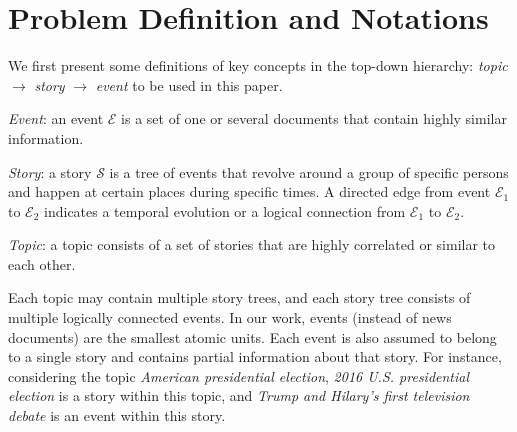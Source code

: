 \section{Problem Definition and Notations}
\label{sec:problem}









We first present some definitions of key concepts in the top-down hierarchy: \textit{topic} $\rightarrow$ \textit{story} $\rightarrow$ \textit{event} to be used in this paper.

\begin{definition}
  \textit{Event}: an event $\mathcal{E}$ is a set of one or several documents that contain highly similar information.
\end{definition}

\begin{definition}
  \textit{Story}: a story $\mathcal{S}$ is a tree of events that revolve around a group of specific persons and happen at certain places during specific times. A directed edge from event $\mathcal{E}_1$ to $\mathcal{E}_2$ indicates a temporal evolution or a logical connection from $\mathcal{E}_1$ to $\mathcal{E}_2$.
\end{definition}

\begin{definition}
  \textit{Topic}: a topic consists of a set of stories that are highly correlated or similar to each other.
  \vspace{-1mm}
\end{definition}


Each topic may contain multiple story trees, and each story tree consists of multiple logically connected events.
In our work, events (instead of news documents) are the smallest atomic units. Each event is also assumed to belong to a single story and contains partial information about that story.
For instance, considering the topic \textit{American presidential election}, \textit{2016 U.S. presidential election} is a story within this topic, and  \textit{Trump and Hilary's first television debate} is an event within this story.


